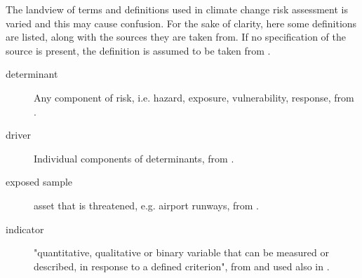 The landview of terms and definitions used in climate change risk assessment is varied and this may cause confusion. For the sake of clarity, here some definitions are listed, along with the sources they are taken from. If no specification of the source is present, the definition is assumed to be taken from \cite{2021ISO14091}.
\begin{description}
  \item[determinant] Any component of risk, i.e. hazard, exposure, vulnerability, response, from \cite[493]{2023SimpsonAdaptationTo}.
  \item[driver] Individual components of determinants, from \cite[493]{2023SimpsonAdaptationTo}.
  \item[exposed sample] asset that is threatened, e.g. airport runways, from \cite[553]{2022DeVivoRiskAssessment}.
  \item[indicator] "quantitative, qualitative or binary variable that can be measured or described, in response to a defined criterion", from \cite{2021ISO14091} and used also in \cite{2022DeVivoRiskAssessment,2023DeVivoApplicationOf,2023DeVivoClimate-RiskAssessment}.
\end{description}
